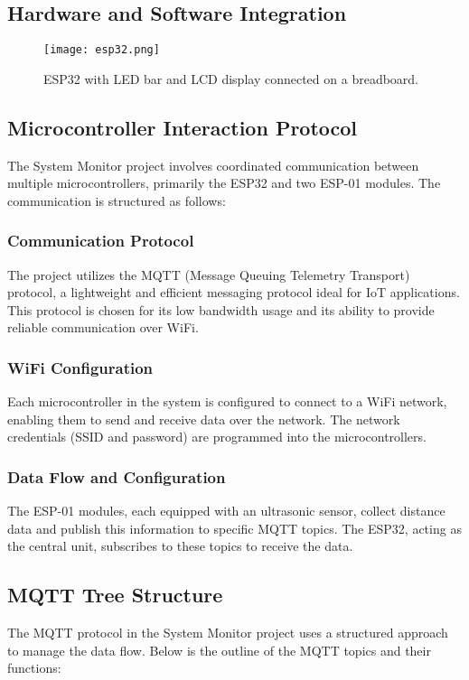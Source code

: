 \documentclass{article}
\begin{document}
\subsection{Hardware and Software Integration}
\begin{figure}[ht]
    \centering
    \texttt{[image: esp32.png]}
    \caption{ESP32 with LED bar and LCD display connected on a breadboard.}
    \label{fig:esp32_system_monitor}
\end{figure}

\subsection{Microcontroller Interaction Protocol}
The System Monitor project involves coordinated communication between multiple microcontrollers, primarily the ESP32 and two ESP-01 modules. The communication is structured as follows:

\subsubsection{Communication Protocol}
The project utilizes the MQTT (Message Queuing Telemetry Transport) protocol, a lightweight and efficient messaging protocol ideal for IoT applications. This protocol is chosen for its low bandwidth usage and its ability to provide reliable communication over WiFi.

\subsubsection{WiFi Configuration}
Each microcontroller in the system is configured to connect to a WiFi network, enabling them to send and receive data over the network. The network credentials (SSID and password) are programmed into the microcontrollers.

\subsubsection{Data Flow and Configuration}
The ESP-01 modules, each equipped with an ultrasonic sensor, collect distance data and publish this information to specific MQTT topics. The ESP32, acting as the central unit, subscribes to these topics to receive the data.

\subsection{MQTT Tree Structure}
The MQTT protocol in the System Monitor project uses a structured approach to manage the data flow. Below is the outline of the MQTT topics and their functions:
\end{document}

